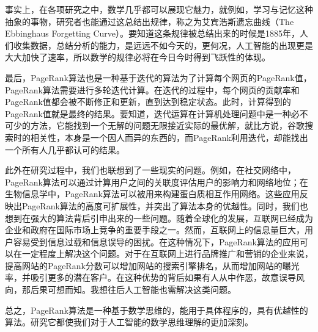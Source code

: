 \documentclass[UTF8,openany]{ctexbook}
\begin{document}
事实上，在各项研究之中，数学几乎都可以展现它魅力，就例如，学习与记忆这种抽象的事物，研究者也能通过这总结出规律，称之为艾宾浩斯遗忘曲线（The Ebbinghaus Forgetting Curve）。要知道这条规律被总结出来的时候是1885年，人们收集数据，总结分析的能力，是远远不如今天的，更何况，人工智能的出现更是大大加快了速率，所以数学的规律必将在今日今时得到飞跃性的体现。

最后，PageRank算法也是一种基于迭代的算法为了计算每个网页的PageRank值，PageRank算法需要进行多轮迭代计算。在迭代的过程中，每个网页的贡献率和PageRank值都会被不断修正和更新，直到达到稳定状态。此时，计算得到的PageRank值就是最终的结果。要知道，迭代运算在计算机处理问题中是一种必不可少的方法，它能找到一个无解的问题无限接近实际的最优解，就比方说，谷歌搜索时的相关性，本身是一个因人而异的东西的，而PageRank利用迭代，却能找出一个所有人几乎都认可的结果。

此外在研究过程中，我们也联想到了一些现实的问题。例如，在社交网络中，PageRank算法可以通过计算用户之间的关联度评估用户的影响力和网络地位；在生物信息学中，PageRank算法可以被用来构建蛋白质相互作用网络。这些应用反映出PageRank算法的高度可扩展性，并突出了算法本身的优越性。同时，我们也想到在强大的算法背后引申出来的一些问题。随着全球化的发展，互联网已经成为企业和政府在国际市场上竞争的重要手段之一。然而，互联网上的信息量巨大，用户容易受到信息过载和信息误导的困扰。在这种情况下，PageRank算法的应用可以在一定程度上解决这个问题。对于在互联网上进行品牌推广和营销的企业来说，提高网站的PageRank分数可以增加网站的搜索引擎排名，从而增加网站的曝光率，并吸引更多的潜在客户。在这种优势的背后如果有人从中作恶，故意误导风向，那后果可想而知。我想往后人工智能也需解决这类问题。

总之，PageRank算法是一种基于数学思维的，能用于具体程序的，具有优越性的算法。研究它都使我们对于人工智能的数学思维理解的更加深刻。
\end{document}
